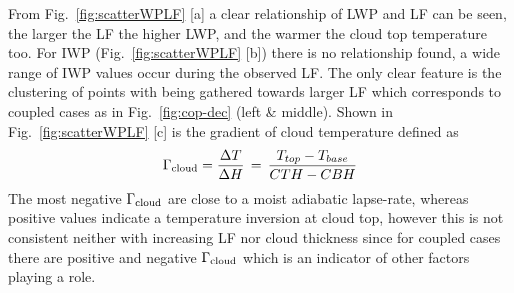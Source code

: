 \documentclass[portrate,a0paper,fontscale=0.45,margin=1cm]{baposter}
\begin{document}
\begin{poster}
{From Fig.~\ref{fig:scatterWPLF} [a] a clear relationship of LWP and LF can be seen, the larger the LF the higher LWP, and the warmer the cloud top temperature too. For IWP (Fig.~\ref{fig:scatterWPLF} [b]) there is no relationship found, a wide range of IWP values occur during the observed LF. The only clear feature is the clustering of points with being gathered towards larger LF which corresponds to coupled cases as in Fig.~\ref{fig:cop-dec} (left \& middle). Shown in Fig.~\ref{fig:scatterWPLF} [c] is the gradient of cloud temperature defined as
\begin{equation}
	\Gamma_{\rm cloud}=\frac{\Delta T}{\Delta H}\,=\,\frac{T_{top}-T_{base}}{CTH-CBH}
	\label{eq:lapserate}
\end{equation}
 The most negative $\Gamma_{\rm cloud}$ are close to a moist adiabatic lapse-rate, whereas positive values indicate a temperature inversion at cloud top, however this is not consistent neither with increasing LF nor cloud thickness since for coupled cases there are positive and negative $\Gamma_{\rm cloud}$ which is an indicator of other factors playing a role.
   
}

\end{poster}
\end{document}
